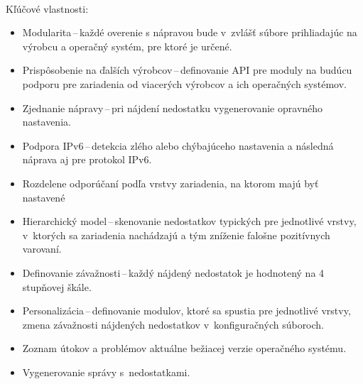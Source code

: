 \newpage
\noindent
\\
Kľúčové vlastnosti:

\begin{itemize}
	\item Modularita\,--\,každé overenie s nápravou bude v~zvlášť súbore prihliadajúc na výrobcu a operačný systém, pre ktoré je určené.
	\vspace{0.5em}
	\item Prispôsobenie na ďalších výrobcov\,--\,definovanie API pre moduly na budúcu podporu pre zariadenia od viacerých výrobcov a ich operačných systémov.
	\vspace{0.5em}
	\item Zjednanie nápravy\,--\,pri nájdení nedostatku vygenerovanie opravného nastavenia.
	\vspace{0.5em}
	\item Podpora IPv6\,--\,detekcia zlého alebo chýbajúceho nastavenia a následná náprava aj pre protokol IPv6.
	\vspace{0.5em}
	\item Rozdelene odporúčaní podľa vrstvy zariadenia, na ktorom majú byť nastavené\vspace{0.5em}
	\item Hierarchický model\,--\,skenovanie nedostatkov typických pre jednotlivé vrstvy, v~ktorých sa zariadenia nachádzajú a tým zníženie falošne pozitívnych varovaní.
	\vspace{0.5em}
	\item Definovanie závažnosti\,--\,každý nájdený nedostatok je hodnotený na 4 stupňovej škále.
	\vspace{0.5em}
	\item Personalizácia\,--\,definovanie modulov, ktoré sa spustia pre jednotlivé vrstvy, zmena závažnosti nájdených nedostatkov v~konfiguračných súboroch.
	\vspace{0.5em}
	\item Zoznam útokov a problémov aktuálne bežiacej verzie operačného systému.
	\vspace{0.5em}
	\item Vygenerovanie správy s~nedostatkami.

\end{itemize}

\newpage
